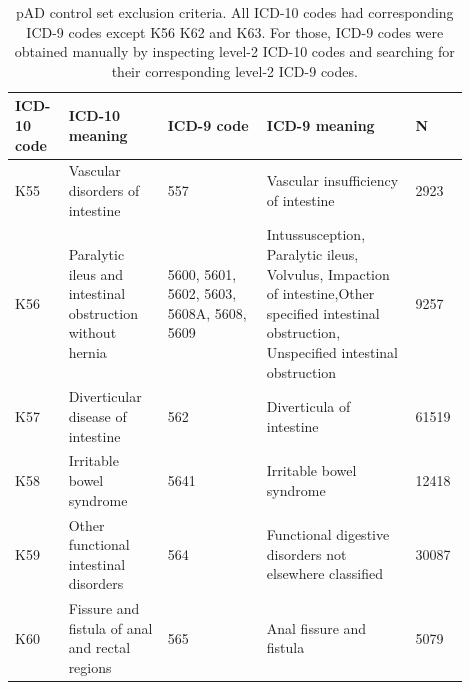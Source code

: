 \begin{table}[H]
  \caption{pAD control set exclusion criteria. All ICD-10 codes had corresponding ICD-9 codes except K56 K62 and K63. For those, ICD-9 codes were obtained manually by inspecting level-2 ICD-10 codes and searching for their corresponding level-2 ICD-9 codes.}
  \label{table:ukbb_ctrl_excl_criteria}
  \begin{tabular}{|p{0.1\linewidth}|p{0.2\linewidth}|p{0.2\linewidth}|p{0.3\linewidth}|p{0.1\linewidth}|}
  \hline
  ICD-10 code & ICD-10 meaning                                            & ICD-9 code                          & ICD-9 meaning     & N                                                                                                                                                          \\ \hline
  K55         & Vascular disorders of intestine                           & 557                                 & Vascular insufficiency of intestine       & 2923                                                                                                                                  \\ \hline
  K56         & Paralytic ileus and intestinal obstruction without hernia & 5600, 5601, 5602, 5603, 5608A, 5608, 5609 & Intussusception, Paralytic ileus, Volvulus, Impaction of intestine,Other specified intestinal obstruction, Unspecified intestinal obstruction & 9257                              \\ \hline
  K57         & Diverticular disease of intestine                         & 562                                 & Diverticula of intestine              &     61519                                                                                                                                  \\ \hline
  K58         & Irritable bowel syndrome                                  & 5641                                & Irritable bowel syndrome          & 12418                                                                                                                                          \\ \hline
  K59         & Other functional intestinal disorders                     & 564                                 & Functional digestive disorders not elsewhere classified      & 30087                                                                                                               \\ \hline
  K60         & Fissure and fistula of anal and rectal regions            & 565                                 & Anal fissure and fistula     & 5079                                                                                                                                               \\ \hline

\end{tabular}
\end{table}

